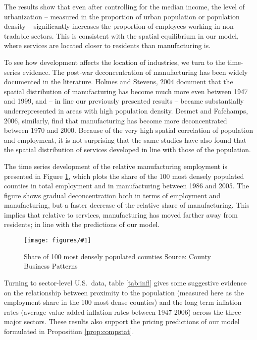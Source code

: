 \documentclass[12pt]{article}
\newcommand{\dofigure}[2]{\begin{figure}
\begin{centering}
\texttt{[image: figures/\#1]}
  \caption{#2\label{fig:#1}}
\end{centering}
\end{figure}}
\begin{document}
The results show that even after controlling for the median income,
the level of urbanization -- measured in the proportion of urban
population or population density -- significantly increases the
proportion of employees working in non-tradable sectors. This is consistent with the spatial equilibrium in our model, where services are located closer to residents than manufacturing is.

To see how development affects the location of industries, we turn to the time-series evidence. The post-war deconcentration of manufacturing has been widely documented in the literature. Holmes and Stevens, 2004 document that the spatial distribution of manufacturing has become much more even between 1947 and 1999, and -- in line our previously presented results -- became substantially underrepresented in areas with high population density. Desmet and Fafchamps, 2006, similarly, find that manufacturing has become more deconcentrated between 1970 and 2000. Because of the very high spatial correlation of population and employment, it is not surprising that the same studies have also found that the spatial distribution of services developed in line with those of the population.


The time series development of the relative manufacturing employment is presented in Figure \ref{fig:deurbanization}, which plots the share of the 100 most densely populated counties in total employment and in manufacturing between 1986 and 2005. The figure shows gradual deconcentration both in terms of employment and manufacturing, but a faster decrease of the relative share of manufacturing. This implies that relative to services, manufacturing has moved farther away from residents; in line with the predictions of our model.

\dofigure{deurbanization}{Share of 100 most densely populated counties\newline
\small Source: County Business Patterns}



Turning to sector-level U.S.~data, table \ref{tab:infl} gives some suggestive evidence on the relationship between proximity to the population (measured here as the employment share in the 100 most dense counties) and the long term inflation rates (average value-added inflation rates between 1947-2006) across the three major sectors. These results also support the pricing predictions of our model formulated in Proposition \ref{prop:compstat}.
\end{document}
